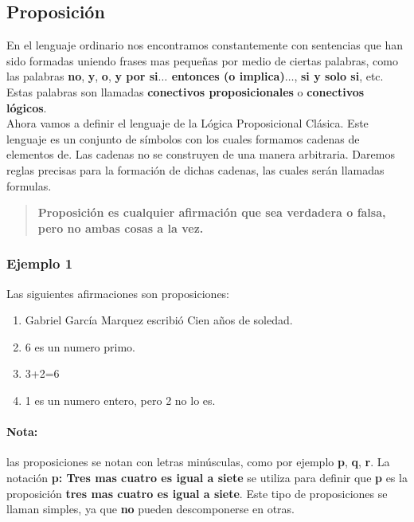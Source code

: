\documentclass[a4paper,11pt,oneside,titlepage,final]{scrartc}
\begin{document}
\subsection{Proposición}

En el lenguaje ordinario nos encontramos constantemente con sentencias que han sido formadas uniendo frases mas pequeñas por medio de ciertas palabras, como las palabras \textbf{no}, \textbf{y}, \textbf{o}, \textbf{y por si$\ldots$ entonces (o implica)$\ldots$}, \textbf{si y solo si}, etc. Estas palabras son llamadas \textbf{conectivos proposicionales} o \textbf{conectivos lógicos}.\\

Ahora vamos a definir el lenguaje de la Lógica Proposicional Clásica. Este lenguaje es un conjunto de símbolos con los cuales formamos cadenas de elementos de. Las cadenas no se construyen de una manera arbitraria. Daremos reglas precisas para la formación de dichas cadenas, las cuales serán llamadas formulas.\\

\begin{quote}
\textbf{Proposición es cualquier afirmación que sea verdadera o falsa, pero no ambas cosas a la vez.}
\end{quote}


\subsubsection*{Ejemplo 1}
Las siguientes afirmaciones son proposiciones:
\begin{enumerate}
\item Gabriel García Marquez escribió Cien años de soledad.
\item 6 es un numero primo.
\item 3+2=6
\item 1 es un numero entero, pero 2 no lo es.
\end{enumerate}

\paragraph{Nota:} las proposiciones se notan con letras minúsculas, como por ejemplo \textbf{p}, \textbf{q}, \textbf{r}. La notación \textbf{p: Tres mas cuatro es igual a siete} se utiliza para definir que \textbf{p} es la proposición \textbf{tres mas cuatro es igual a siete}. Este tipo de proposiciones se llaman simples, ya que \textbf{no} pueden descomponerse en otras.
\end{document}

